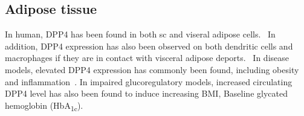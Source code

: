 \subsection{Adipose tissue}
In human, DPP4 has been found in both sc and viseral adipose cells.~\cite{Lamers2011} In addition, DPP4 expression has also been observed on both dendritic cells and macrophages if they are in contact with visceral adipose deports.~\cite{Zhong2013} In disease models, elevated DPP4 expression has commonly been found, including obesity and inflammation~\cite{Zhong2013}. In impaired glucoregulatory models, increased circulating DPP4 level has also been found to induce increasing BMI, Baseline glycated hemoglobin (HbA\textsubscript{1c}). 